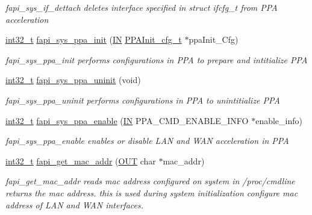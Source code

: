 \begin{DoxyCompactItemize}
\begin{DoxyCompactList}\small\item\em fapi\-\_\-sys\-\_\-if\-\_\-dettach deletes interface specified in struct ifcfg\-\_\-t from P\-P\-A acceleration \end{DoxyCompactList}\item 
\hyperlink{commondefs_8h_a32f2e37ee053cf2ce8ca28d1f74630e5}{int32\-\_\-t} \hyperlink{group__FAPI__SYSTEM_ga6d7486525b367cb3c6475435e34169c7}{fapi\-\_\-sys\-\_\-ppa\-\_\-init} (\hyperlink{group__LIBHELP_gac2bbd6d630a06a980d9a92ddb9a49928}{I\-N} \hyperlink{group__FAPI__SYSTEM_gac5554359c4faf9e76d67a5d7f4144b3d}{P\-P\-A\-Init\-\_\-cfg\-\_\-t} $\ast$ppa\-Init\-\_\-\-Cfg)
\begin{DoxyCompactList}\small\item\em fapi\-\_\-sys\-\_\-ppa\-\_\-init performs configurations in P\-P\-A to prepare and intitialize P\-P\-A \end{DoxyCompactList}\item 
\hyperlink{commondefs_8h_a32f2e37ee053cf2ce8ca28d1f74630e5}{int32\-\_\-t} \hyperlink{group__FAPI__SYSTEM_ga8c4577626350e28774bab5fd8cb7bdda}{fapi\-\_\-sys\-\_\-ppa\-\_\-uninit} (void)
\begin{DoxyCompactList}\small\item\em fapi\-\_\-sys\-\_\-ppa\-\_\-uninit performs configurations in P\-P\-A to unintitialize P\-P\-A \end{DoxyCompactList}\item 
\hyperlink{commondefs_8h_a32f2e37ee053cf2ce8ca28d1f74630e5}{int32\-\_\-t} \hyperlink{group__FAPI__SYSTEM_gac7348e9a243fbb4c375d46750decd50a}{fapi\-\_\-sys\-\_\-ppa\-\_\-enable} (\hyperlink{group__LIBHELP_gac2bbd6d630a06a980d9a92ddb9a49928}{I\-N} P\-P\-A\-\_\-\-C\-M\-D\-\_\-\-E\-N\-A\-B\-L\-E\-\_\-\-I\-N\-F\-O $\ast$enable\-\_\-info)
\begin{DoxyCompactList}\small\item\em fapi\-\_\-sys\-\_\-ppa\-\_\-enable enables or disable L\-A\-N and W\-A\-N acceleration in P\-P\-A \end{DoxyCompactList}\item 
\hyperlink{commondefs_8h_a32f2e37ee053cf2ce8ca28d1f74630e5}{int32\-\_\-t} \hyperlink{group__FAPI__SYSTEM_ga0db69202cbcc9cebad1f39a0d23879a7}{fapi\-\_\-get\-\_\-mac\-\_\-addr} (\hyperlink{group__LIBHELP_gaec78e7a9e90a406a56f859ee456e8eae}{O\-U\-T} char $\ast$mac\-\_\-addr)
\begin{DoxyCompactList}\small\item\em fapi\-\_\-get\-\_\-mac\-\_\-addr reads mac address configured on system in /proc/cmdline  returns the mac address. this is used during system initialization  configure mac address of L\-A\-N and W\-A\-N interfaces. \end{DoxyCompactList}\item 

\end{DoxyCompactItemize}

